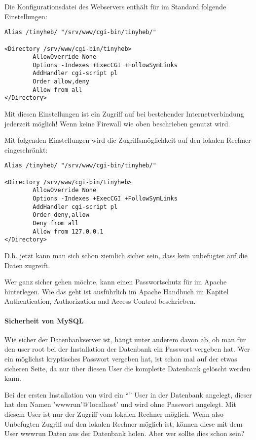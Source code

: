 Die Konfigurationsdatei des Webservers enthält für \tinyHeb\/ im Standard
folgende Einstellungen:
\begin{verbatim}
Alias /tinyheb/ "/srv/www/cgi-bin/tinyheb/"

<Directory /srv/www/cgi-bin/tinyheb>
        AllowOverride None
        Options -Indexes +ExecCGI +FollowSymLinks
        AddHandler cgi-script pl
        Order allow,deny
        Allow from all
</Directory>
\end{verbatim}

Mit diesen Einstellungen ist ein Zugriff auf \tinyHeb\/ bei bestehender
Internetverbindung jederzeit möglich! Wenn keine Firewall wie oben 
beschrieben genutzt wird.

Mit folgenden Einstellungen wird die Zugriffsmöglichkeit auf den lokalen
Rechner eingeschränkt:
\begin{verbatim}
Alias /tinyheb/ "/srv/www/cgi-bin/tinyheb/"

<Directory /srv/www/cgi-bin/tinyheb>
        AllowOverride None
        Options -Indexes +ExecCGI +FollowSymLinks
        AddHandler cgi-script pl
        Order deny,allow
        Deny from all
        Allow from 127.0.0.1 
</Directory>
\end{verbatim}

D.h. jetzt kann man sich schon ziemlich sicher sein, dass kein
unbefugter auf die Daten zugreift. 

Wer ganz sicher gehen möchte,
kann einen Passwortschutz für \tinyHeb\/ im Apache hinterlegen.
Wie das geht ist ausführlich im Apache Handbuch im Kapitel
Authentication, Authorization and Access Control beschrieben.


\paragraph{Sicherheit von MySQL}

Wie sicher der Datenbankserver ist, hängt unter anderem davon ab, ob man
für den user root bei der Installation der Datenbank ein Passwort
vergeben hat. Wer ein möglichst kryptisches Passwort vergeben hat, ist
schon mal auf der etwas sicheren Seite, da nur über diesen User
die komplette Datenbank gelöscht werden kann.

Bei der ersten Installation von \tinyHeb\/ wird ein ``\tinyHeb\/'' User
in der Datenbank angelegt, dieser hat den Namen 'wwwrun'@'localhost' und 
wird ohne Passwort angelegt. Mit diesem User ist nur der Zugriff vom
lokalen Rechner möglich. Wenn also Unbefugten Zugriff auf den lokalen
Rechner möglich ist, können diese mit dem User wwwrun Daten aus der
\tinyHeb\/ Datenbank holen. Aber wer sollte dies schon sein?


